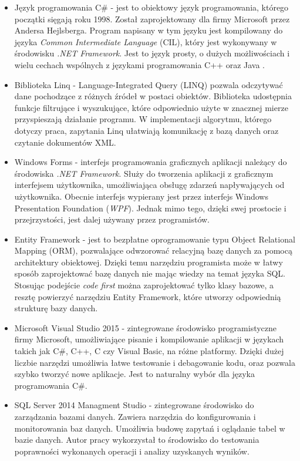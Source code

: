 \begin{itemize}
	\item Język programowania C\# - jest to obiektowy język programowania, którego początki sięgają roku 1998. Został zaprojektowany dla firmy Microsoft przez Andersa Hejlsberga. Program napisany w tym języku jest kompilowany do języka \textit{Common Intermediate Language} (CIL), który jest wykonywany w środowisku \textit{.NET Framework}. Jest to język prosty, o dużych możliwościach i wielu cechach wspólnych z językami programowania C++ oraz Java \cite{Csharp}. 
	
	\item Biblioteka Linq - Language-Integrated Query (LINQ) pozwala odczytywać dane pochodzące z różnych źródeł w postaci obiektów. Biblioteka udostępnia funkcje filtrujące i wyszukujące, które odpowiednio użyte w znacznej mierze przyspieszają działanie programu. W implementacji algorytmu, którego dotyczy praca, zapytania Linq ułatwiają komunikację z bazą danych oraz czytanie dokumentów XML.
	
	\item Windows Forms - interfejs programowania graficznych aplikacji należący do środowiska \textit{.NET Framework}. Służy do tworzenia aplikacji z graficznym interfejsem użytkownika, umożliwiająca obsługę zdarzeń napływających od użytkownika. Obecnie interfejs wypierany jest przez interfejs Windows Presentation Foundation  (\textit{WPF}). Jednak mimo tego, dzięki swej prostocie i przejrzystości, jest dalej używany przez programistów.
	 
	\item Entity Framework - jest to bezpłatne oprogramowanie typu Object Relational Mapping (ORM), pozwalające odwzorować relacyjną bazę danych za pomocą architektury obiektowej. Dzięki temu narzędziu programista może w łatwy sposób zaprojektować bazę danych nie mając wiedzy na temat języka SQL. Stosując podejście \textit{code first} można zaprojektować tylko klasy bazowe, a resztę powierzyć narzędziu Entity Framework, które utworzy odpowiednią strukturę bazy danych.
	 
	\item Microsoft Visual Studio 2015 - zintegrowane środowisko programistyczne firmy Microsoft, umożliwiające pisanie i kompilowanie aplikacji w językach takich jak C\#, C++, C czy Visual Basic, na różne platformy. Dzięki dużej liczbie narzędzi umożliwia łatwe testowanie i debagowanie kodu, oraz pozwala szybko tworzyć nowe aplikacje. Jest to naturalny wybór dla języka programowania C\#.
	
	\item SQL Server 2014 Managment Studio - zintegrowane środowisko do zarządzania bazami danych. Zawiera narzędzia do konfigurowania i monitorowania baz danych. Umożliwia budowę zapytań i oglądanie tabel w bazie danych. Autor pracy wykorzystał to środowisko do testowania poprawności wykonanych operacji i analizy uzyskanych wyników.
\end{itemize}

